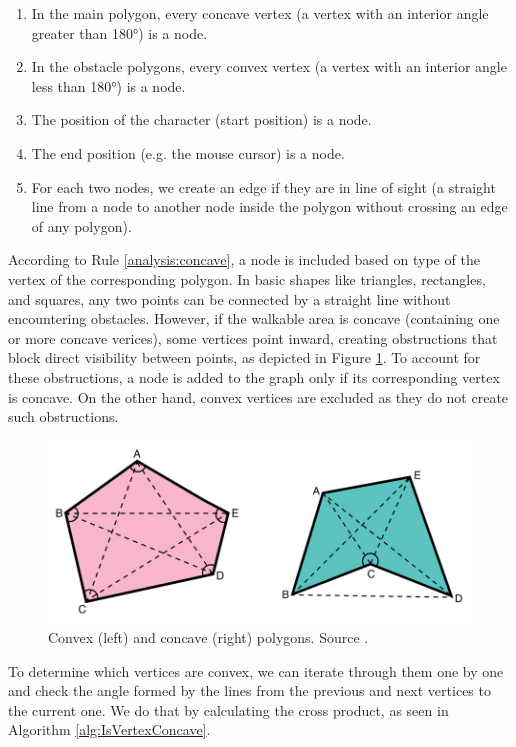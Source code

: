 \begin{enumerate}[label=\color{purple}\textbf{R{\arabic*}}]
  \item \label{analysis:concave} In the main polygon, every concave vertex (a vertex with an interior angle greater than 180°) is a node.
  \item \label{analysis:convex} In the obstacle polygons, every convex vertex (a vertex with an interior angle less than 180°) is a node.
  \item \label{analysis:start} The position of the character (start position) is a node.
  \item \label{analysis:end} The end position (e.g. the mouse cursor) is a node.
  \item \label{analysis:LOS} For each two nodes, we create an edge if they are in line of sight (a straight line from a node to another node inside the polygon without crossing an edge of any polygon). 
\end{enumerate}

According to Rule \ref{analysis:concave}, a node is included based on type of the vertex of the corresponding polygon. In basic shapes like triangles, rectangles, and squares, any two points can be connected by a straight line without encountering obstacles. However, if the walkable area is concave (containing one or more concave verices), some vertices point inward, creating obstructions that block direct visibility between points, as depicted in Figure \ref{fig:Polygons}. To account for these obstructions, a node is added to the graph only if its corresponding vertex is concave. On the other hand, convex vertices are excluded as they do not create such obstructions.

\begin{figure}[H]
\centering
\includegraphics[width=.8\linewidth]{img/polygons.png}
\caption{Convex (left) and concave (right) polygons. Source \cite{Polygons}.}
\label{fig:Polygons}
\end{figure}

To determine which vertices are convex, we can iterate through them one by one and check the angle formed by the lines from the previous and next vertices to the current one. We do that by calculating the cross product, as seen in Algorithm \ref{alg:IsVertexConcave}.


